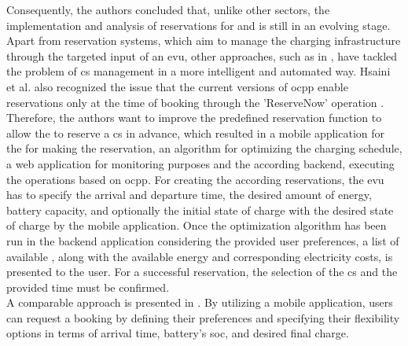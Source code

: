Consequently, the authors concluded that, unlike other sectors, the implementation and analysis of reservations for  and  is still in an evolving stage. \\
\noindent Apart from reservation systems, which aim to manage the charging infrastructure through the targeted input of an \acrshort{evu}, other approaches, such as in \cite{hsaini_ocpp-based_2022}, have tackled the problem of \acrshort{cs} management in a more intelligent and automated way.
Hsaini et al. also recognized the issue that the current versions of \acrshort{ocpp} enable reservations only at the time of booking through the 'ReserveNow' operation \cite{noauthor_ocpp_nodate,noauthor_ocpp_nodate}.
Therefore, the authors want to improve the predefined reservation function to allow the  to reserve a \acrshort{cs} in advance, which resulted in a mobile application for the  for making the reservation, an algorithm for optimizing the charging schedule, a web application for monitoring purposes and the according backend, executing the operations based on \acrshort{ocpp}.
For creating the according reservations, the \acrshort{evu} has to specify the arrival and departure time, the desired amount of energy, battery capacity, and optionally the initial state of charge with the desired state of charge by the mobile application.
Once the optimization algorithm has been run in the backend application considering the provided user preferences, a list of available , along with the available energy and corresponding electricity costs, is presented to the user. For a successful reservation, the selection of the \acrshort{cs} and the provided time must be confirmed. \\
\noindent A comparable approach is presented in \cite{orcioni_ev_2020}. By utilizing a mobile application, users can request a booking by defining their preferences and specifying their flexibility options in terms of arrival time, battery's \acrshort{soc}, and desired final charge.
